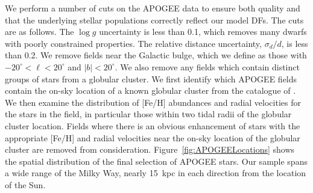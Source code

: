 We perform a number of cuts on the APOGEE data to ensure both quality and that the underlying stellar populations correctly reflect our model DFs. The cuts are as follows. The $\log g$ uncertainty is less than 0.1, which removes many dwarfs with poorly constrained properties. The relative distance uncertainty, $\sigma_{d}/d$, is less than 0.2. We remove fields near the Galactic bulge, which we define as those with $-20^{\circ} < \ell < 20^{\circ}$ and $|b| < 20^{\circ}$. We also remove any fields which contain distinct groups of stars from a globular cluster. We first identify which APOGEE fields contain the on-sky location of a known globular cluster from the catalogue of \textcite[][ The December 2010 version]{harris96}. We then examine the distribution of [Fe/H] abundances and radial velocities for the stars in the field, in particular those within two tidal radii of the globular cluster location. Fields where there is an obvious enhancement of stars with the appropriate [Fe/H] and radial velocities near the on-sky location of the globular cluster are removed from consideration. Figure~\ref{fig:APOGEELocations} shows the spatial distribution of the final selection of APOGEE stars. Our sample spans a wide range of the Milky Way, nearly 15~kpc in each direction from the location of the Sun.

